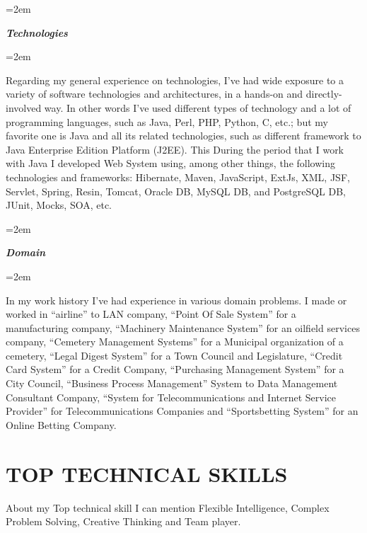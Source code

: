\documentclass[paper=a4,fontsize=11pt]{scrartcl} %
\newlength{\spacebox}
\newcommand{\sepspace}{\vspace*{1em}}		%
\newcommand{\NewPart}[1]{\section*{\uppercase{#1}}}
\newcommand{\PersonalEntry}[2]{
		\noindent\hangindent=2em\hangafter=0 %
		\parbox{\spacebox}{        %
		\textit{#1}}		       %
		\hspace{1.5em} #2 \par}    %
\newcommand{\SkillsEntry}[2]{      %
		\noindent\hangindent=2em\hangafter=0 %
		\parbox{\spacebox}{        %
		\textit{#1}}			   %
		\hspace{1.5em} #2 \par}    %
\begin{document}
\SkillsEntry{\large{\textbf{Technologies}}}{}
\SkillsEntry{}{
Regarding my general experience on technologies, I've had wide exposure to a variety of software technologies and architectures, in a hands-on and directly-involved way. In other words I've used different types of technology and a lot of programming languages, such as Java, Perl, PHP, Python, C, etc.; but my favorite one is Java and all its related technologies, such as different framework to Java Enterprise Edition Platform (J2EE). This During the period that I work with Java I developed Web System using, among other things, the following technologies and frameworks: Hibernate, Maven, JavaScript, ExtJs, XML, JSF, Servlet, Spring, Resin, Tomcat, Oracle DB, MySQL DB, and PostgreSQL DB, JUnit, Mocks, SOA, etc.
}

\sepspace

\SkillsEntry{\large{\textbf{Domain}}}{}
\SkillsEntry{}{
	In my work history I've had experience in various domain problems. I made or worked in “airline” to LAN company, “Point Of Sale System” for a manufacturing company, “Machinery Maintenance System” for an oilfield services company, “Cemetery Management Systems” for a Municipal organization of a cemetery, “Legal Digest System” for a Town Council and Legislature, “Credit Card System” for a Credit Company, “Purchasing Management System” for a City Council,  “Business Process Management” System to Data Management Consultant Company, “System for Telecommunications and Internet Service Provider” for Telecommunications Companies and “Sportsbetting System” for an Online Betting Company.
}

\NewPart{Top Technical Skills}{
About my Top technical skill I can mention Flexible Intelligence, Complex Problem Solving, Creative Thinking and Team player.
}

\sepspace
\end{document}
